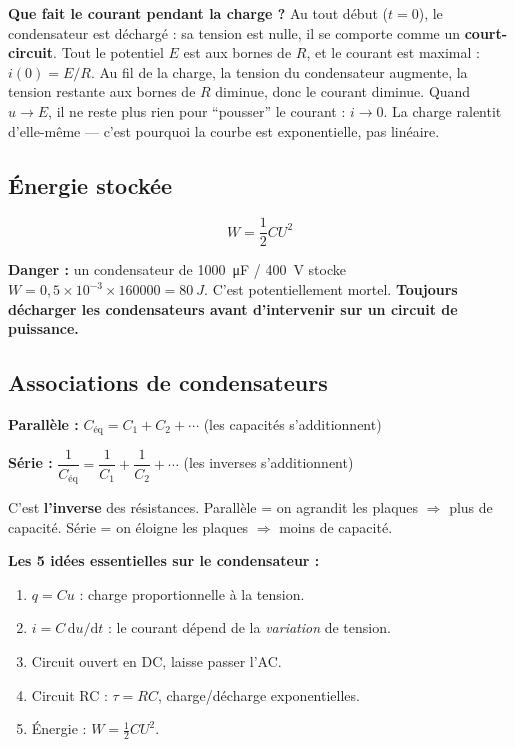 \documentclass[12pt,a4paper,twoside]{book}
\begin{document}
\begin{intuition}
\textbf{Que fait le courant pendant la charge ?} Au tout début ($t = 0$), le condensateur est déchargé : sa tension est nulle, il se comporte comme un \textbf{court-circuit}. Tout le potentiel $E$ est aux bornes de $R$, et le courant est maximal : $i(0) = E/R$. Au fil de la charge, la tension du condensateur augmente, la tension restante aux bornes de $R$ diminue, donc le courant diminue. Quand $u \to E$, il ne reste plus rien pour ``pousser'' le courant : $i \to 0$. La charge ralentit d'elle-même --- c'est pourquoi la courbe est exponentielle, pas linéaire.
\end{intuition}

\subsection{Énergie stockée}

\begin{formule}
\[
\boxed{W = \frac{1}{2}CU^2}
\]
\end{formule}

\begin{pratique}
\textbf{Danger :} un condensateur de \SI{1000}{\micro F} / \SI{400}{V} stocke $W = 0{,}5 \times 10^{-3} \times 160000 = \SI{80}{J}$. C'est potentiellement mortel. \textbf{Toujours décharger les condensateurs avant d'intervenir sur un circuit de puissance.}
\end{pratique}

\subsection{Associations de condensateurs}

\begin{formule}
\textbf{Parallèle :} $\boxed{C_{\text{éq}} = C_1 + C_2 + \cdots}$ \qquad (les capacités s'additionnent)

\textbf{Série :} $\boxed{\dfrac{1}{C_{\text{éq}}} = \dfrac{1}{C_1} + \dfrac{1}{C_2} + \cdots}$ \qquad (les inverses s'additionnent)
\end{formule}

\begin{intuition}
C'est \textbf{l'inverse} des résistances. Parallèle = on agrandit les plaques $\Rightarrow$ plus de capacité. Série = on éloigne les plaques $\Rightarrow$ moins de capacité.
\end{intuition}

\begin{retenir}
\textbf{Les 5 idées essentielles sur le condensateur :}
\begin{enumerate}[nosep]
\item $q = Cu$ : charge proportionnelle à la tension.
\item $i = C\,\mathrm{d}u/\mathrm{d}t$ : le courant dépend de la \textit{variation} de tension.
\item Circuit ouvert en DC, laisse passer l'AC.
\item Circuit RC : $\tau = RC$, charge/décharge exponentielles.
\item Énergie : $W = \frac{1}{2}CU^2$.
\end{enumerate}
\end{retenir}
\end{document}
